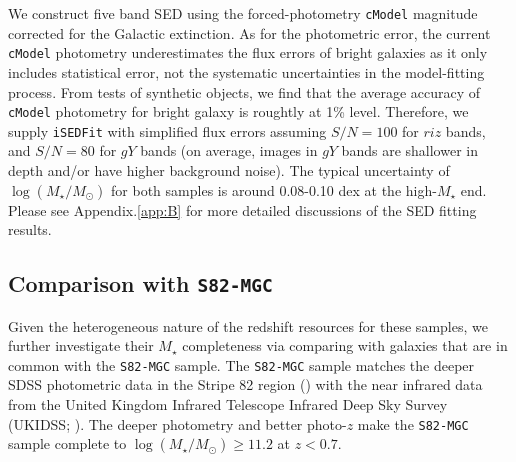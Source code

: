 \documentclass{emulateapj}
\def\cmodel{\texttt{cModel}}
\def\mstar{{$M_{\star}$}}
\def\logms{{$\log (M_{\star}/M_{\odot})$}}
\newcommand{\song}[1]{\textcolor{magenta}{\textbf{[Song: #1]}}}
\begin{document}
\begin{CJK*}{UTF8}{gbsn}
    We construct five band SED using the forced-photometry \cmodel{} magnitude corrected 
    for the Galactic extinction. 
    As for the photometric error, the current \cmodel{} photometry underestimates 
    the flux errors of bright galaxies as it only includes statistical error, not the 
    systematic uncertainties in the model-fitting process.  
    From tests of synthetic objects, we find that the average accuracy of \cmodel{} 
    photometry for bright galaxy is roughtly at 1\% level. 
    Therefore, we supply \texttt{iSEDFit} with simplified flux errors assuming $S/N = 100$ 
    for $riz$ bands, and $S/N = 80$ for $gY$ bands (on average, images in $gY$ bands are 
    shallower in depth and/or have higher background noise).  
    The typical uncertainty of \logms{} for both samples is around 0.08-0.10 dex at the 
    high-\mstar{} end. 
    Please see Appendix.\ref{app:B} for more detailed discussions of the SED fitting
    results.  
    
    
\subsection{Comparison with \texttt{S82-MGC}}
    \label{ssec:s82}

    Given the heterogeneous nature of the redshift resources for these samples, we 
    further investigate their \mstar{} completeness via comparing with galaxies that are 
    in common with the \texttt{S82-MGC} sample. 
    The \texttt{S82-MGC} sample matches the deeper SDSS photometric data in the Stripe 82 
    region (\citealt{Annis2014}) with the near infrared data from the United Kingdom 
    Infrared Telescope Infrared Deep Sky Survey (UKIDSS; \citealt{Lawrence2007}). 
    The deeper photometry and better photo-$z$ make the \texttt{S82-MGC} sample complete 
    to \logms{}$\geq 11.2$ at $z<0.7$.  
    

\end{CJK*}
\end{document}
